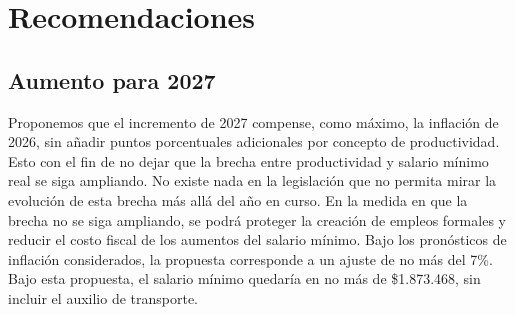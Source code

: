 %

\section{Recomendaciones}
\label{sec:propuestas-2027}

\subsection{Aumento para 2027}

Proponemos que el incremento de 2027 compense, como máximo, la inflación de 2026, sin añadir puntos porcentuales adicionales por concepto de productividad. Esto con el fin de no dejar que la brecha entre productividad y salario mínimo real se siga ampliando. No existe nada en la legislación que no permita mirar la evolución de esta brecha más allá del año en curso. En la medida en que la brecha no se siga ampliando, se podrá proteger la creación de empleos formales y reducir el costo fiscal de los aumentos del salario mínimo.
Bajo los pronósticos de inflación considerados, la propuesta corresponde a un ajuste de no más del 7\%. %
Bajo esta propuesta, el salario mínimo quedaría en no más de \$1.873.468, sin incluir el auxilio de transporte.


%




